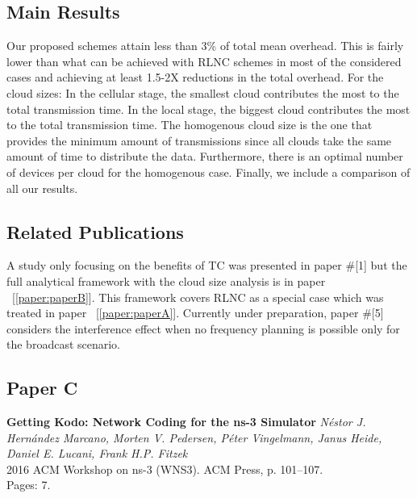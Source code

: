 \subsection*{Main Results}
Our proposed schemes attain less than 3\% of total mean overhead. This is fairly lower than what can be achieved with \ac{RLNC} schemes in most of the considered cases and achieving at least 1.5-2X reductions in the total overhead. For the cloud sizes: In the cellular stage, the smallest cloud contributes the most to the total transmission time. In the local stage, the biggest cloud contributes the most to the total transmission time. The homogenous cloud size is the one that provides the minimum amount of transmissions since all clouds take the same amount of time to distribute the data. Furthermore, there is an optimal number of devices per cloud for the homogenous case. Finally, we include a comparison of all our results.

\subsection*{Related Publications}
A study only focusing on the benefits of \ac{TC} was presented in paper \#[1] but the full analytical framework with the cloud size analysis is in paper ~[\ref{paper:paperB}]. This framework covers \ac{RLNC} as a special case which was treated in paper ~[\ref{paper:paperA}]. Currently under preparation, paper \#[5] considers the interference effect when no frequency planning is possible only for the broadcast scenario.

\clearpage

\subsection{Paper C}
\textbf{Getting Kodo: Network Coding for the ns-3 Simulator}
\textit{N\'estor J. Hern\'andez Marcano, Morten V. Pedersen, P\'eter
Vingelmann, Janus Heide, Daniel E. Lucani, Frank H.P. Fitzek}
\\ 2016 ACM Workshop on ns-3 (WNS3). ACM Press, p. 101--107.
\\ Pages: 7.
